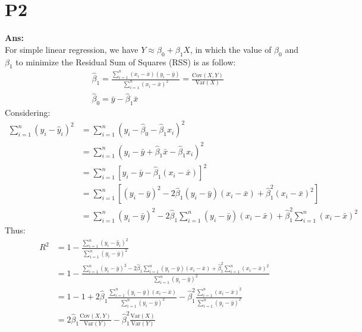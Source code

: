 \documentclass[twoside]{homework}
\begin{document}
\section*{P2}
\textbf{Ans:}\\
For simple linear regression, we have $Y \approx \beta_0 + \beta_1 X$, in which the value of $\beta_0$ and $\beta_1$ to minimize the Residual Sum of Squares (RSS) is as follow:\\
\begin{equation}
    \begin{aligned}
    &\hat{\beta}_1 = \frac{\sum_{i=1}^n (x_i-\bar{x})(y_i-\bar{y})}{\sum_{i=1}^n (x_i-\bar{x})^2} = \frac{\mathrm{Cov}(X, Y)}{\mathrm{Var}(X)}\\
    &\hat{\beta}_0 = \bar{y} - \hat{\beta}_1\bar{x}
    \end{aligned}
\end{equation}{}
Considering:\\
\begin{equation}
    \begin{aligned}
    \sum_{i=1}^n (y_i-\hat{y}_i)^2 &= \sum_{i=1}^n (y_i - \hat{\beta}_0 - \hat{\beta}_1 x_i)^2\\
    &= \sum_{i=1}^n (y_i - \bar{y} + \hat{\beta}_1 \bar{x} - \hat{\beta}_1 x_i)^2\\
    &= \sum_{i=1}^n [y_i - \bar{y} - \hat{\beta}_1 (x_i - \bar{x})]^2\\
    &= \sum_{i=1}^n [(y_i - \bar{y})^2 - 2 \hat{\beta}_1 (y_i - \bar{y}) (x_i - \bar{x}) + \hat{\beta}_1^2 (x_i - \bar{x})^2]\\
    &= \sum_{i=1}^n (y_i - \bar{y})^2 - 2 \hat{\beta}_1 \sum_{i=1}^n (y_i - \bar{y}) (x_i - \bar{x}) + \hat{\beta}_1^2 \sum_{i=1}^n (x_i - \bar{x})^2
    \end{aligned}
\end{equation}{}
Thus:\\
\begin{equation}
    \begin{aligned}
    R^2 &= 1 - \frac{\sum_{i=1}^n (y_i-\hat{y}_i)^2}{\sum_{i=1}^n (y_i-\bar{y})^2}\\
    &= 1 - \frac{\sum_{i=1}^n (y_i - \bar{y})^2 - 2 \hat{\beta}_1 \sum_{i=1}^n (y_i - \bar{y}) (x_i - \bar{x}) + \hat{\beta}_1^2 \sum_{i=1}^n (x_i - \bar{x})^2}{\sum_{i=1}^n (y_i-\bar{y})^2}\\
    &= 1 - 1 + 2 \hat{\beta}_1 \frac{\sum_{i=1}^n (y_i - \bar{y}) (x_i - \bar{x})}{\sum_{i=1}^n (y_i-\bar{y})^2} - \hat{\beta}_1^2 \frac{\sum_{i=1}^n (x_i - \bar{x})^2}{\sum_{i=1}^n (y_i-\bar{y})^2}\\
    &= 2 \hat{\beta}_1 \frac{\mathrm{Cov}(X,Y)}{\mathrm{Var}(Y)} - \hat{\beta}_1^2 \frac{\mathrm{Var}(X)}{\mathrm{Var}(Y)}
    \end{aligned}
\end{equation}{}
\end{document}
